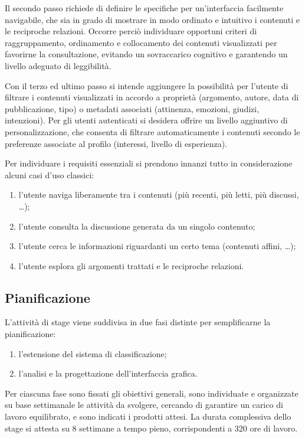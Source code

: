 Il secondo passo richiede di definire le specifiche per un'interfaccia facilmente navigabile, che sia in grado di mostrare in modo ordinato e intuitivo i contenuti e le reciproche relazioni. Occorre perciò individuare opportuni criteri di raggruppamento, ordinamento e collocamento dei contenuti visualizzati per favorirne la consultazione, evitando un sovraccarico cognitivo e garantendo un livello adeguato di leggibilità.

Con il terzo ed ultimo passo si intende aggiungere la possibilità per l'utente di filtrare i contenuti visualizzati in accordo a proprietà (argomento, autore, data di pubblicazione, tipo) o metadati associati (attinenza, emozioni, giudizi, intenzioni). Per gli utenti autenticati si desidera offrire un livello aggiuntivo di personalizzazione, che consenta di filtrare automaticamente i contenuti secondo le preferenze associate al profilo (interessi, livello di esperienza).

Per individuare i requisiti essenziali si prendono innanzi tutto in considerazione alcuni casi d'uso classici:
\begin{enumerate}
\item l'utente naviga liberamente tra i contenuti (più recenti, più letti, più discussi, \ldots);
\item l'utente consulta la discussione generata da un singolo contenuto;
\item l'utente cerca le informazioni riguardanti un certo tema (contenuti affini, \ldots);
\item l'utente esplora gli argomenti trattati e le reciproche relazioni.
\end{enumerate}

\subsection{Pianificazione}
L'attività di stage viene suddivisa in due fasi distinte per semplificarne la pianificazione:
\begin{enumerate}
\item l'estensione del sistema di classificazione;
\item l'analisi e la progettazione dell'interfaccia grafica.
\end{enumerate}

Per ciascuna fase sono fissati gli obiettivi generali, sono individuate e organizzate su base settimanale le attività da svolgere, cercando di garantire un carico di lavoro equilibrato, e sono indicati i prodotti attesi. La durata complessiva dello stage si attesta su 8 settimane a tempo pieno, corrispondenti a 320 ore di lavoro.

